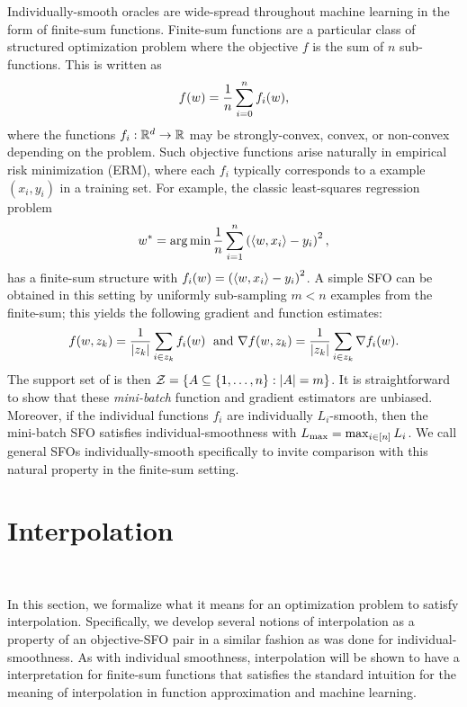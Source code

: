 Individually-smooth oracles are wide-spread throughout machine learning in the form of finite-sum functions. 
Finite-sum functions are a particular class of structured optimization problem where the objective \( f \) is the sum of \( n \) sub-functions. 
This is written as
\begin{align*}
    f(w) = \frac{1}{n} \sum_{i = 0}^n f_i(w), 
\end{align*}
where the functions \( f_i : \mathbb{R}^d \rightarrow \mathbb{R} \) may be strongly-convex, convex, or non-convex depending on the problem.
Such objective functions arise naturally in empirical risk minimization (ERM), where each \( f_i \) typically corresponds to a example \( (x_i, y_i) \) in a training set.
For example, the classic least-squares regression problem 
\[ w^* = \mathop{\rm arg\,min} \frac{1}{n} \sum_{i=1}^n \left(\left\langle w, x_i\right\rangle - y_i\right)^2, \]
has a finite-sum structure with \( f_i(w) =  \left(\left\langle w, x_i\right\rangle - y_i\right)^2\).
A simple \ac{SFO} can be obtained in this setting by uniformly sub-sampling \( m < n \) examples from the finite-sum; this yields the following gradient and function estimates:
\[ f(w, z_{k}) = \frac{1}{|z_{k}|} \sum_{i \in z_{k}} f_i(w) \; \text{ and } \nabla f(w, z_{k}) = \frac{1}{|z_{k}|} \sum_{i \in z_{k}} \nabla f_i(w). \]
The support set of \oracle{} is then \( \mathcal{Z} = \left\{ A \subseteq \left\{1, \dots, n\right\} : |A| = m \right\} \).
It is straightforward to show that these \emph{mini-batch} function and gradient estimators are unbiased.
Moreover, if the individual functions \( f_i \) are individually \( L_i \)-smooth, then the mini-batch \ac{SFO} satisfies individual-smoothness with \( L_{\text{max}} = \max_{i\in [n]} L_i \).
We call general \acp{SFO} \oracle{} individually-smooth specifically to invite comparison with this natural property in the finite-sum setting. 


\section{Interpolation}~\label{sec:interpolation}

In this section, we formalize what it means for an optimization problem to satisfy interpolation.
Specifically, we develop several notions of interpolation as a property of an objective-\ac{SFO} pair in a similar fashion as was done for individual-smoothness.
As with individual smoothness, interpolation will be shown to have a interpretation for finite-sum functions that satisfies the standard intuition for the meaning of interpolation in function approximation and machine learning. 

